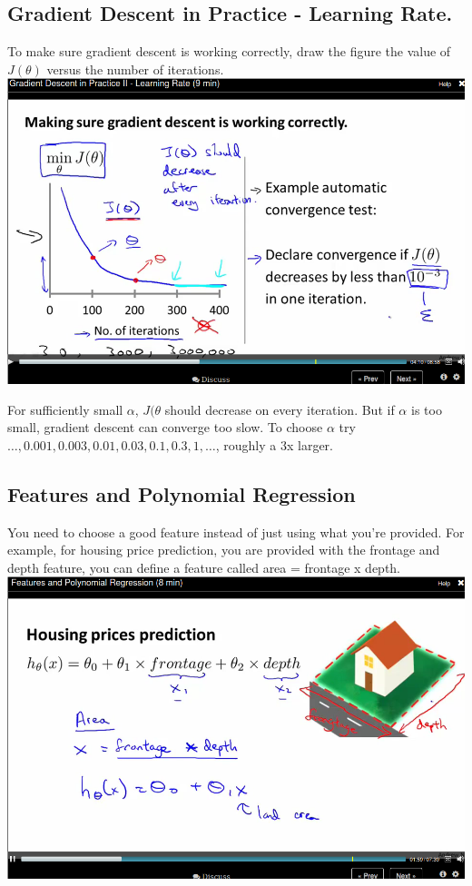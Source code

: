 \documentclass[11pt]{article}
\begin{document}
\subsection*{Gradient Descent in Practice - Learning Rate.}
\label{sec-5-4}
To make sure gradient descent is working correctly, draw the figure the value of \(J(\theta)\) versus the number of iterations.
\includegraphics[width=.9\linewidth]{./images/screenshot-17.png}

For sufficiently small \(\alpha\), \(J(\theta\) should decrease on every iteration. But if $\alpha$  is too small, gradient descent can converge too slow. To choose \(\alpha\) try \( \dots, 0.001, 0.003,0.01, 0.03,0.1, 0.3,1, \dots\), roughly a 3x larger.
\subsection*{Features and Polynomial Regression}
\label{sec-5-5}
You need to choose a good feature instead of just using what you're provided. For example, for housing price prediction, you are provided with the frontage and depth feature, you can define a feature called area = frontage x depth.
\includegraphics[width=.9\linewidth]{./images/screenshot-18.png}
\end{document}
